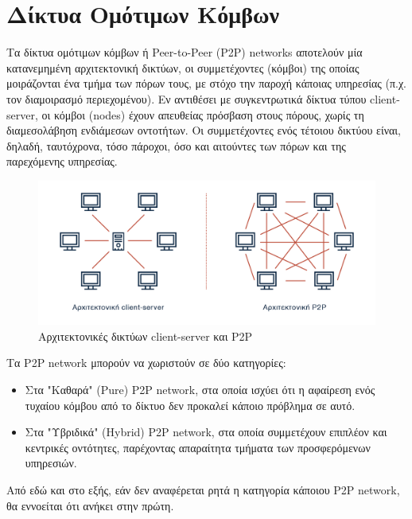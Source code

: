 \section{Δίκτυα Ομότιμων Κόμβων} \label{section:2-4-p2p-networks}

Τα δίκτυα ομότιμων κόμβων ή Peer-to-Peer (P2P) networks αποτελούν μία κατανεμημένη αρχιτεκτονική δικτύων, οι συμμετέχοντες (κόμβοι) της οποίας μοιράζονται ένα τμήμα των πόρων τους, με στόχο την παροχή κάποιας υπηρεσίας (π.χ. τον διαμοιρασμό περιεχομένου). Εν αντιθέσει με συγκεντρωτικά δίκτυα τύπου client-server, οι κόμβοι (nodes) έχουν απευθείας πρόσβαση στους πόρους, χωρίς τη διαμεσολάβηση ενδιάμεσων οντοτήτων. Οι συμμετέχοντες ενός τέτοιου δικτύου είναι, δηλαδή, ταυτόχρονα, τόσο πάροχοι, όσο και αιτούντες των πόρων και της παρεχόμενης υπηρεσίας.\cite{2.4-p2p-networking}

\begin{figure}[H]
	\centering
	\includegraphics[width=.95\textwidth]{assets/figures/chapter-2/2.4.p2p-networks}
	\caption{Αρχιτεκτονικές δικτύων client-server και P2P}
\end{figure}

Τα P2P network μπορούν να χωριστούν σε δύο κατηγορίες:

\begin{itemize}
	\item Στα "Καθαρά" (Pure) P2P network, στα οποία ισχύει ότι η αφαίρεση ενός τυχαίου κόμβου από το δίκτυο δεν προκαλεί κάποιο πρόβλημα σε αυτό.
	\item Στα "Υβριδικά" (Hybrid) P2P network, στα οποία συμμετέχουν επιπλέον και κεντρικές οντότητες, παρέχοντας απαραίτητα τμήματα των προσφερόμενων υπηρεσιών.
\end{itemize}

Από εδώ και στο εξής, εάν δεν αναφέρεται ρητά η κατηγορία κάποιου P2P network, θα εννοείται ότι ανήκει στην πρώτη.